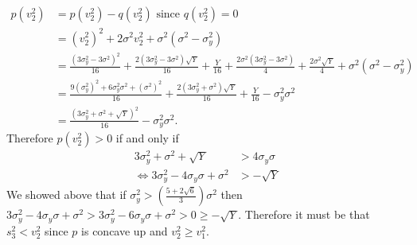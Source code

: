 \documentclass{article}
\begin{document}
\begin{enumerate}
\begin{align*}
p(v_2^2)&=p(v_2^2)-q(v_2^2) \text{ since } q(v_2^2)=0
\\ &=(v_2^2)^2+2\sigma^2v_2^2+\sigma^2(\sigma^2-\sigma_y^2)
\\ &= \frac{(3\sigma_y^2-3\sigma^2)^2}{16}+\frac{2(3\sigma_y^2-3\sigma^2)\sqrt{Y}}{16}+\frac{Y}{16}+\frac{2\sigma^2(3\sigma_y^2-3\sigma^2)}{4}+\frac{2\sigma^2\sqrt{Y}}{4}+\sigma^2(\sigma^2-\sigma_y^2)
\\&=\frac{9(\sigma_y^2)^2+6\sigma_y^2\sigma^2+(\sigma^2)^2}{16}+\frac{2(3\sigma_y^2+\sigma^2)\sqrt{Y}}{16}+\frac{Y}{16}-\sigma_y^2\sigma^2
\\&=\frac{(3\sigma_y^2+\sigma^2+\sqrt{Y})^2}{16}-\sigma_y^2\sigma^2.
\end{align*}
Therefore $p(v_2^2)>0$ if and only if 
\begin{align*}
3\sigma_y^2+\sigma^2+\sqrt{Y}&>4\sigma_y\sigma
\\ \Leftrightarrow 3\sigma_y^2-4\sigma_y\sigma+\sigma^2&>-\sqrt{Y}
\end{align*}
We showed above that if $\sigma_y^2>\left(\frac{5+2\sqrt{6}}{3}\right)\sigma^2$ then $3\sigma_y^2-4\sigma_y\sigma+\sigma^2>3\sigma_y^2-6\sigma_y\sigma+\sigma^2>0\geq-\sqrt{Y}$. Therefore it must be that $s_3^2<v_2^2$ since $p$ is concave up and $v_2^2\geq v_1^2$. 



\end{enumerate}
\end{document}
